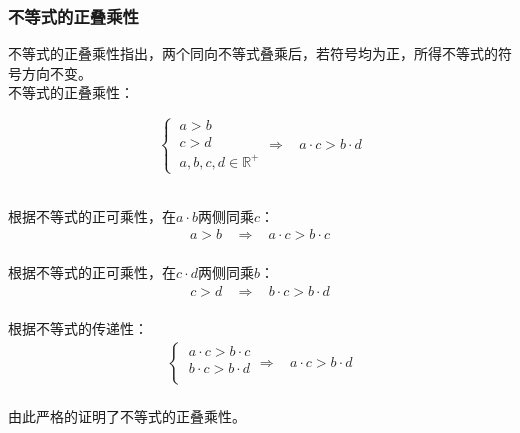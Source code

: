 \documentclass[UTF8]{ctexart}
\begin{document}
\subsubsection{不等式的正叠乘性}
    \setcounter{equation}{0}
    不等式的正叠乘性指出，两个同向不等式叠乘后，若符号均为正，所得不等式的符号方向不变。\\[3mm]
    不等式的正叠乘性：\vspace{5pt}
    \begin{large}
        \begin{equation*}
            \begin{cases}
                ~a>b\\[3mm]
                ~c>d\\[3mm]
                ~a,b,c,d\in\mathbb{R^+}
            \end{cases}
            \Longrightarrow~~~~a\cdot c>b\cdot d
        \end{equation*}
    \end{large}\\[3mm]
    根据不等式的正可乘性，在$a\cdot b$两侧同乘$c$：
    \begin{align}
        a>b~~~~\Longrightarrow~~~~a\cdot c>b\cdot c
    \end{align}\\
    根据不等式的正可乘性，在$c\cdot d$两侧同乘$b$：
    \begin{align}
        c>d~~~~\Longrightarrow~~~~b\cdot c>b\cdot d
    \end{align}\\
    根据不等式的传递性：
    \begin{align}
        \begin{cases}
            ~a\cdot c>b\cdot c\\[4mm]
            ~b\cdot c>b\cdot d\\
        \end{cases}\Longrightarrow~~~~
        a\cdot c>b\cdot d
    \end{align}\\
    由此严格的证明了不等式的正叠乘性。

\newpage
\end{document}
